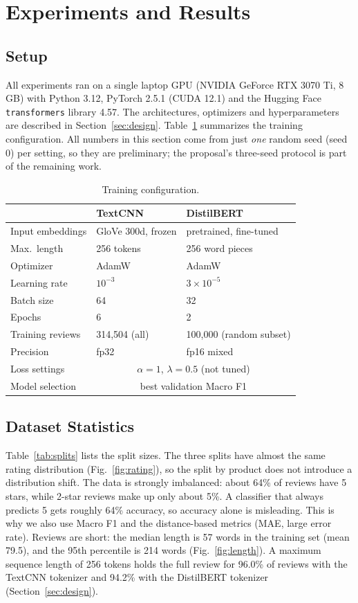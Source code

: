 \section{Experiments and Results}
\label{sec:experiments}

\subsection{Setup}
All experiments ran on a single laptop GPU (NVIDIA GeForce RTX 3070 Ti, 8\,GB) with Python 3.12, PyTorch 2.5.1 (CUDA 12.1) and the Hugging Face \texttt{transformers} library 4.57. The architectures, optimizers and hyperparameters are described in Section~\ref{sec:design}. Table~\ref{tab:setup} summarizes the training configuration. All numbers in this section come from just \emph{one} random seed (seed 0) per setting, so they are preliminary; the proposal's three-seed protocol is part of the remaining work.

\begin{table}[t]
\caption{Training configuration.}
\label{tab:setup}
\centering
\small
\begin{tabular}{lll}
\toprule
 & TextCNN & DistilBERT \\
\midrule
Input embeddings & GloVe 300d, frozen & pretrained, fine-tuned \\
Max.\ length & 256 tokens & 256 word pieces \\
Optimizer & AdamW & AdamW \\
Learning rate & $10^{-3}$ & $3\times10^{-5}$ \\
Batch size & 64 & 32 \\
Epochs & 6 & 2 \\
Training reviews & 314{,}504 (all) & 100{,}000 (random subset) \\
Precision & fp32 & fp16 mixed \\
Loss settings & \multicolumn{2}{c}{$\alpha=1$, $\lambda=0.5$ (not tuned)} \\
Model selection & \multicolumn{2}{c}{best validation Macro F1} \\
\bottomrule
\end{tabular}
\end{table}

\subsection{Dataset Statistics}
Table~\ref{tab:splits} lists the split sizes. The three splits have almost the same rating distribution (Fig.~\ref{fig:rating}), so the split by product does not introduce a distribution shift. The data is strongly imbalanced: about 64\% of reviews have 5 stars, while 2-star reviews make up only about 5\%. A classifier that always predicts 5 gets roughly 64\% accuracy, so accuracy alone is misleading. This is why we also use Macro F1 and the distance-based metrics (MAE, large error rate). Reviews are short: the median length is 57 words in the training set (mean 79.5), and the 95th percentile is 214 words (Fig.~\ref{fig:length}). A maximum sequence length of 256 tokens holds the full review for 96.0\% of reviews with the TextCNN tokenizer and 94.2\% with the DistilBERT tokenizer (Section~\ref{sec:design}).

